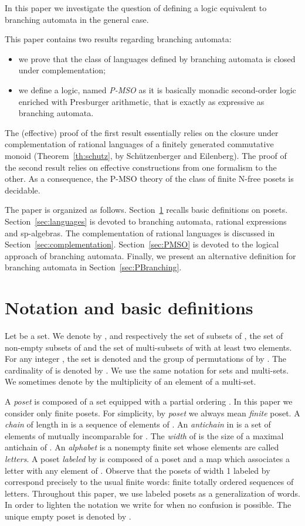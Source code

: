\documentclass{CSML}
\begin{document}
In this paper we investigate the question of defining a logic equivalent to branching automata in the general case. 

This paper contains two results regarding branching automata:
\begin{itemize}
\item we prove that the class of languages defined by branching automata is closed under complementation;
\item we define a logic, named \emph{P-MSO} as it is basically monadic second-order logic enriched with Presburger arithmetic, that is exactly as expressive as branching automata.
\end{itemize}

\noindent The (effective) proof of the first result essentially relies on the closure under complementation of rational languages of a finitely generated commutative monoid (Theorem~\ref{th:schutz}, by Sch\"utzenberger and Eilenberg).
The proof of the second result relies on effective constructions from one formalism to the other.
As a consequence, the P-MSO theory of the class of finite N-free posets is decidable.

The paper is organized as follows. Section~\ref{sec:not} recalls basic definitions on posets. Section~\ref{sec:languages} is devoted to branching automata, rational expressions and sp-algebras. The complementation of rational languages is discussed in Section~\ref{sec:complementation}. Section~\ref{sec:PMSO} is devoted to the logical approach of branching automata. Finally, we present an alternative definition for branching automata in Section~\ref{sec:PBranching}.

\section{Notation and basic definitions}
\label{sec:not}

Let  be a set. We denote by ,  and  respectively the set of subsets of , the set of non-empty subsets of  and the set of multi-subsets of  with at least two elements. 
For any integer , the set  is denoted  and the group of permutations of  by .
The cardinality of  is denoted by .
We use the same notation for sets and multi-sets. We sometimes denote by  the multiplicity  of an element  of a multi-set. 

A \emph{poset}  is composed of a set  equipped with a partial ordering .
In this paper we consider only finite posets.
For simplicity, by \emph{poset} we always mean \emph{finite} poset.
A \emph{chain} of length  in  is a sequence  of elements of .
An \emph{antichain}  in  is a set of elements of  mutually incomparable for .
The \emph{width} of  is the size of a maximal antichain of .
An \emph{alphabet} is a nonempty finite set whose elements are called \emph{letters}.
A poset  \emph{labeled} by  is composed of a poset  and a map  which associates a letter  with any element of . 
Observe that the posets of width 1 labeled by  correspond precisely to the usual finite words: finite totally ordered sequences of letters.
Throughout this paper, we use labeled posets as a generalization of words.
In order to lighten the notation we write  for  when no confusion is possible.
The unique empty poset is denoted by .
\end{document}

